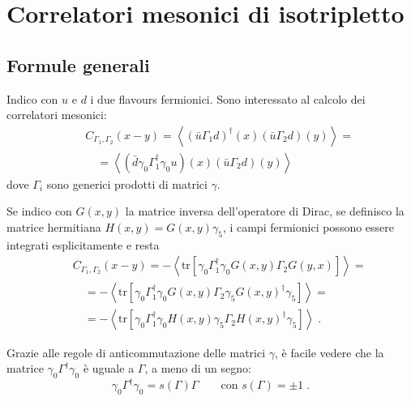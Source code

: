 \documentclass[a4paper]{article}
\newcommand{\tr}{\mathrm{tr}}
\newcommand{\point}{\; .}
\begin{document}
\section{Correlatori mesonici di isotripletto}

\subsection{Formule generali}

Indico con $u$ e $d$ i due flavours fermionici. Sono interessato al calcolo dei correlatori mesonici:
\begin{eqnarray}
&& C_{\Gamma_1,\Gamma_2}(x-y) = \left<
\left( \bar{u} \Gamma_1 d \right)^\dagger(x)
\left( \bar{u} \Gamma_2 d \right)(y)
\right> = \nonumber \\
&& \quad = \left<
\left( \bar{d} \gamma_0 \Gamma_1^\dagger \gamma_0 u \right)(x)
\left( \bar{u} \Gamma_2 d \right)(y)
\right>
\end{eqnarray}
dove $\Gamma_i$ sono generici prodotti di matrici $\gamma$.

Se indico con $G(x,y)$ la matrice inversa dell'operatore di Dirac, se definisco la matrice hermitiana $H(x,y) = G(x,y) \gamma_5$, i campi fermionici possono essere integrati esplicitamente e resta
\begin{eqnarray}
&& C_{\Gamma_1,\Gamma_2}(x-y) = - \left< \tr
\left[ \gamma_0 \Gamma_1^\dagger \gamma_0 G(x,y) \Gamma_2 G(y,x) \right]
\right> = \nonumber \\
&& \quad = - \left< \tr
\left[ \gamma_0 \Gamma_1^\dagger \gamma_0 G(x,y) \Gamma_2 \gamma_5 G(x,y)^\dagger \gamma_5 \right]
\right> = \nonumber \\
&& \quad = - \left< \tr
\left[ \gamma_0 \Gamma_1^\dagger \gamma_0 H(x,y) \gamma_5 \Gamma_2 H(x,y)^\dagger \gamma_5 \right]
\right> \point
\end{eqnarray}

Grazie alle regole di anticommutazione delle matrici $\gamma$, \`{e} facile vedere che la matrice $\gamma_0 \Gamma^\dagger \gamma_0$ \`{e} uguale a $\Gamma$, a meno di un segno:
\begin{equation} \label{gamma0_adj}
\gamma_0 \Gamma^\dagger \gamma_0 = s(\Gamma) \Gamma \qquad \textrm{con } s(\Gamma) = \pm 1 \point
\end{equation}
\end{document}
